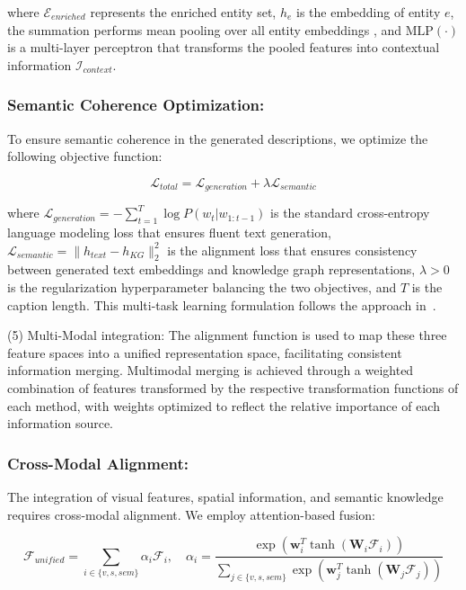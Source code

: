 \documentclass[runningheads,14pt]{llncs}
\begin{document}
where $\mathcal{E}_{enriched}$ represents the enriched entity set, $h_e$ is the embedding of entity $e$, the summation performs mean pooling over all entity embeddings \cite{zaheer2017deep}, and $\text{MLP}(\cdot)$ is a multi-layer perceptron that transforms the pooled features into contextual information $\mathcal{I}_{context}$.

\subsubsection{Semantic Coherence Optimization:}
To ensure semantic coherence in the generated descriptions, we optimize the following objective function:

\begin{equation}
\mathcal{L}_{total} = \mathcal{L}_{generation} + \lambda \mathcal{L}_{semantic}
\end{equation}

where $\mathcal{L}_{generation} = -\sum_{t=1}^T \log P(w_t|w_{1:t-1})$ is the standard cross-entropy language modeling loss that ensures fluent text generation, $\mathcal{L}_{semantic} = \|h_{text} - h_{KG}\|_2^2$ is the alignment loss that ensures consistency between generated text embeddings and knowledge graph representations, $\lambda > 0$ is the regularization hyperparameter balancing the two objectives, and $T$ is the caption length. This multi-task learning formulation follows the approach in~\cite{cornia2020meshed}.


(5) Multi-Modal integration: The alignment function is used to map these three feature spaces into a unified representation space, 
facilitating consistent information merging. Multimodal merging is achieved through a weighted combination of features transformed by the respective 
transformation functions of each method, with weights optimized to reflect the relative importance of each information source.

\subsubsection{Cross-Modal Alignment:}
The integration of visual features, spatial information, and semantic knowledge requires cross-modal alignment. We employ attention-based fusion:

\begin{equation}
\mathcal{F}_{unified} = \sum_{i \in \{v,s,sem\}} \alpha_i \mathcal{F}_i, \quad \alpha_i = \frac{\exp(\mathbf{w}_i^T \tanh(\mathbf{W}_i \mathcal{F}_i))}{\sum_{j \in \{v,s,sem\}} \exp(\mathbf{w}_j^T \tanh(\mathbf{W}_j \mathcal{F}_j))}
\end{equation}
\end{document}
